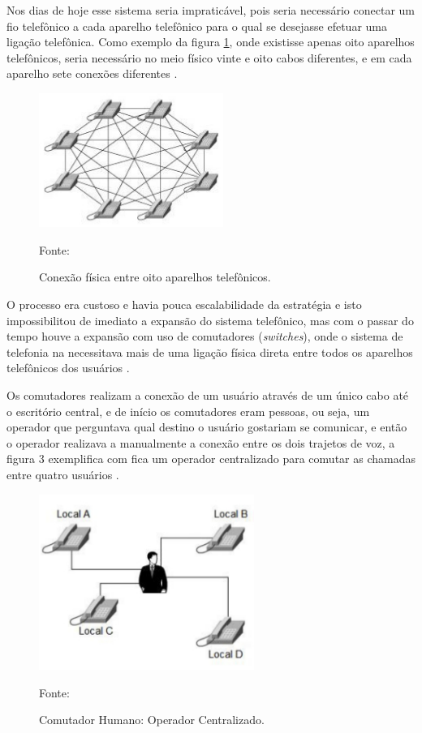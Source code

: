 Nos dias de hoje esse sistema seria impraticável, pois seria necessário conectar um fio telefônico a cada aparelho telefônico para o qual se desejasse efetuar uma ligação telefônica. Como exemplo da figura \ref{Figura2}, onde existisse apenas oito aparelhos telefônicos, seria necessário no meio físico vinte e oito cabos diferentes, e em cada aparelho sete conexões diferentes \cite{eduardomaronasmonks2006}.

\begin{figure}[h]
	\centering
	\includegraphics[width=6.0cm]{imagens/rebeBasicaOitoTel.jpg}
	\caption{Conexão física entre oito aparelhos telefônicos.}
    \label{Figura2}
    Fonte: \cite{davidson2008}
\end{figure}

O processo era custoso e havia pouca escalabilidade da estratégia e isto impossibilitou de imediato a expansão do sistema telefônico, mas com o passar do tempo houve a expansão com uso de comutadores (\textit{switches}), onde o sistema de telefonia na necessitava mais de uma ligação física direta entre todos os aparelhos telefônicos dos usuários \cite{thiagowinkler2007}.

Os comutadores realizam a conexão de um usuário através de um único cabo até o escritório central, e de início os comutadores eram pessoas, ou seja, um operador que perguntava qual destino o usuário gostariam se comunicar, e então o operador realizava a manualmente a conexão entre os dois trajetos de voz, a figura 3 exemplifica com fica um operador centralizado para comutar as chamadas entre quatro usuários \cite{eduardomaronasmonks2006}.

\begin{figure}[h]
	\centering
	\includegraphics[width=7.0cm]{imagens/operadorCentralizado.jpg}
	\caption{Comutador Humano: Operador Centralizado.}
    \label{Figura3}
    Fonte: \cite{davidson2008}
\end{figure}

